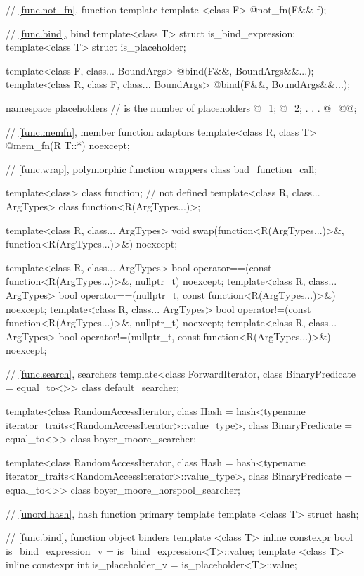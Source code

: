 \begin{codeblock}
{  // \ref{func.not_fn}, function template 
  template <class F>
    @\unspec@ not_fn(F&& f);

  // \ref{func.bind}, bind
  template<class T> struct is_bind_expression;
  template<class T> struct is_placeholder;

  template<class F, class... BoundArgs>
    @\unspec@ bind(F&&, BoundArgs&&...);
  template<class R, class F, class... BoundArgs>
    @\unspec@ bind(F&&, BoundArgs&&...);

  namespace placeholders {
    //  is the  number of placeholders
    @\seebelownc@ _1;
    @\seebelownc@ _2;
               .
               .
               .
    @\seebelownc@ _@@;
  }

  // \ref{func.memfn}, member function adaptors
  template<class R, class T>
    @\unspec@ mem_fn(R T::*) noexcept;

  // \ref{func.wrap}, polymorphic function wrappers
  class bad_function_call;

  template<class> class function; // not defined
  template<class R, class... ArgTypes> class function<R(ArgTypes...)>;

  template<class R, class... ArgTypes>
    void swap(function<R(ArgTypes...)>&, function<R(ArgTypes...)>&) noexcept;

  template<class R, class... ArgTypes>
    bool operator==(const function<R(ArgTypes...)>&, nullptr_t) noexcept;
  template<class R, class... ArgTypes>
    bool operator==(nullptr_t, const function<R(ArgTypes...)>&) noexcept;
  template<class R, class... ArgTypes>
    bool operator!=(const function<R(ArgTypes...)>&, nullptr_t) noexcept;
  template<class R, class... ArgTypes>
    bool operator!=(nullptr_t, const function<R(ArgTypes...)>&) noexcept;

  // \ref{func.search}, searchers
  template<class ForwardIterator, class BinaryPredicate = equal_to<>>
    class default_searcher;

  template<class RandomAccessIterator,
           class Hash = hash<typename iterator_traits<RandomAccessIterator>::value_type>,
           class BinaryPredicate = equal_to<>>
    class boyer_moore_searcher;

  template<class RandomAccessIterator,
           class Hash = hash<typename iterator_traits<RandomAccessIterator>::value_type>,
           class BinaryPredicate = equal_to<>>
    class boyer_moore_horspool_searcher;

  // \ref{unord.hash}, hash function primary template
  template <class T>
    struct hash;

  // \ref{func.bind}, function object binders
  template <class T>
    inline constexpr bool is_bind_expression_v = is_bind_expression<T>::value;
  template <class T>
    inline constexpr int is_placeholder_v = is_placeholder<T>::value;
}
\end{codeblock}

